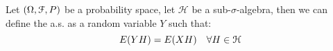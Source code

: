 Let \(\pqty{\Omega, \mathcal{F}, P}\) be a probability space, let \(\mathcal{H}\) be a sub-\(\sigma\)-algebra, then we can define the  a.s. as a random variable \(Y\) such that:
\begin{equation*}
    E(YH) = E\pqty{XH} \quad \forall H \in \mathcal{H}
\end{equation*}





    
